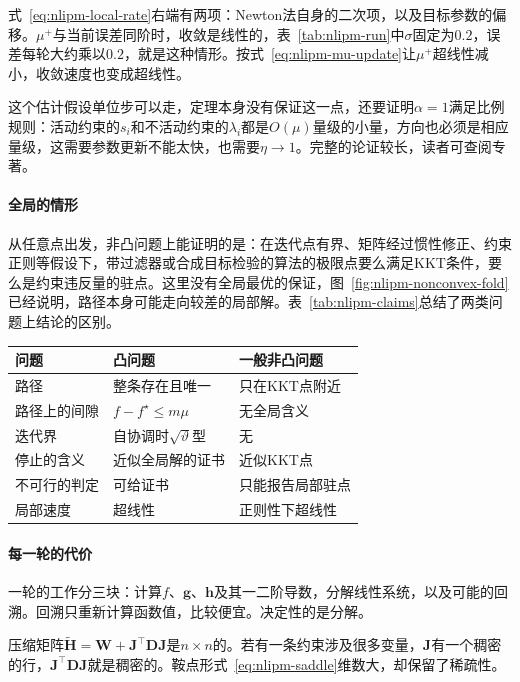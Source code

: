 式~\eqref{eq:nlipm-local-rate}右端有两项：Newton法自身的二次项，以及目标参数的偏移。$\mu^+$与当前误差同阶时，收敛是线性的，表~\ref{tab:nlipm-run}中$\sigma$固定为$0.2$，误差每轮大约乘以$0.2$，就是这种情形。按式~\eqref{eq:nlipm-mu-update}让$\mu^+$超线性减小，收敛速度也变成超线性。

这个估计假设单位步可以走，定理本身没有保证这一点，还要证明$\alpha=1$满足比例规则：活动约束的$s_i$和不活动约束的$\lambda_i$都是$O(\mu)$量级的小量，方向也必须是相应量级，这需要参数更新不能太快，也需要$\eta\to1$。完整的论证较长，读者可查阅专著。

\paragraph{全局的情形}
从任意点出发，非凸问题上能证明的是：在迭代点有界、矩阵经过惯性修正、约束正则等假设下，带过滤器或合成目标检验的算法的极限点要么满足KKT条件，要么是约束违反量的驻点。这里没有全局最优的保证，图~\ref{fig:nlipm-nonconvex-fold}已经说明，路径本身可能走向较差的局部解。表~\ref{tab:nlipm-claims}总结了两类问题上结论的区别。

\begin{BookInlineTable}
  \centering
  \footnotesize
  \begin{tabular}{@{}lll@{}}
    \toprule
    问题 & 凸问题 & 一般非凸问题\\
    \midrule
    路径 & 整条存在且唯一 & 只在KKT点附近\\
    路径上的间隙 & $f-f^\star\leq m\mu$ & 无全局含义\\
    迭代界 & 自协调时$\sqrt{\vartheta}$型 & 无\\
    停止的含义 & 近似全局解的证书 & 近似KKT点\\
    不可行的判定 & 可给证书 & 只能报告局部驻点\\
    局部速度 & 超线性 & 正则性下超线性\\
    \bottomrule
  \end{tabular}
  \caption{内点法在凸问题与非凸问题上的结论。}
  \label{tab:nlipm-claims}
\end{BookInlineTable}

\paragraph{每一轮的代价}
一轮的工作分三块：计算$f$、$\bm{g}$、$\bm{h}$及其一二阶导数，分解线性系统，以及可能的回溯。回溯只重新计算函数值，比较便宜。决定性的是分解。

压缩矩阵$\tilde{\bm{H}}=\bm{W}+\bm{J}^\top\bm{D}\bm{J}$是$n\times n$的。若有一条约束涉及很多变量，$\bm{J}$有一个稠密的行，$\bm{J}^\top\bm{D}\bm{J}$就是稠密的。鞍点形式~\eqref{eq:nlipm-saddle}维数大，却保留了稀疏性。

